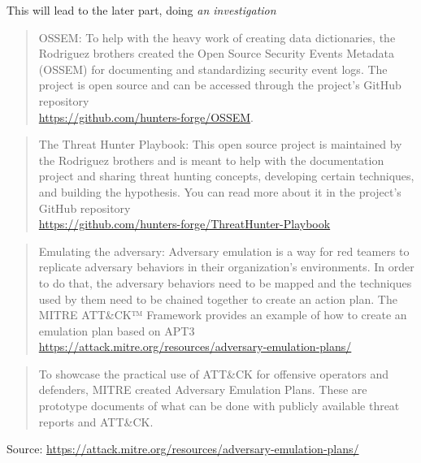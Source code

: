 \documentclass[Screen16to9,17pt]{foils}
\begin{document}
This will lead to the later part, doing \emph{an investigation}




\begin{quote}
OSSEM: To help with the heavy work of creating data dictionaries, the Rodriguez
brothers created the Open Source Security Events Metadata (OSSEM) for
documenting and standardizing security event logs. The project is open source and
can be accessed through the project's GitHub repository\\
\url{https://github.com/hunters-forge/OSSEM}.
\end{quote}




\begin{quote}
The Threat Hunter Playbook: This open source project is maintained by the
Rodriguez brothers and is meant to help with the documentation project and
sharing threat hunting concepts, developing certain techniques, and building
the hypothesis. You can read more about it in the project's GitHub repository\\
\url{https://github.com/hunters-forge/ThreatHunter-Playbook}
\end{quote}



\begin{quote}
Emulating the adversary: Adversary emulation is a way for red teamers to
replicate adversary behaviors in their organization's environments. In order to
do that, the adversary behaviors need to be mapped and the techniques used by
them need to be chained together to create an action plan. The MITRE ATT\&CK™
Framework provides an example of how to create an emulation plan based on APT3\\
\url{https://attack.mitre.org/resources/adversary-emulation-plans/}
\end{quote}



\begin{quote}
To showcase the practical use of ATT\&CK for offensive operators and defenders, MITRE created Adversary Emulation Plans. These are prototype documents of what can be done with publicly available threat reports and ATT\&CK.
\end{quote}
Source: \url{https://attack.mitre.org/resources/adversary-emulation-plans/}
\end{document}
